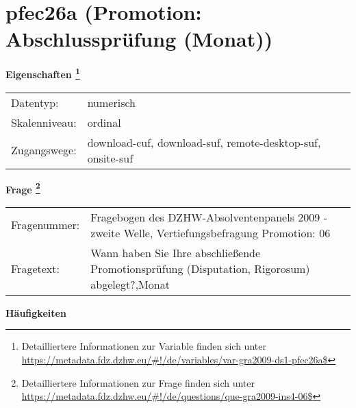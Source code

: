
    \setcounter{footnote}{0}

    \vspace*{-1.8cm}
	\section{pfec26a (Promotion: Abschlussprüfung (Monat))}
	\label{section:pfec26a}



    \vspace*{0.5cm}
    \noindent\textbf{Eigenschaften
	\footnote{Detailliertere Informationen zur Variable finden sich unter
		\url{https://metadata.fdz.dzhw.eu/\#!/de/variables/var-gra2009-ds1-pfec26a$}}}\\
	\begin{tabularx}{\hsize}{@{}lX}
	Datentyp: & numerisch \\
	Skalenniveau: & ordinal \\
	Zugangswege: &
	  download-cuf, 
	  download-suf, 
	  remote-desktop-suf, 
	  onsite-suf
 \\
    \end{tabularx}



				\vspace*{0.5cm}
                \noindent\textbf{Frage
	                \footnote{Detailliertere Informationen zur Frage finden sich unter
		              \url{https://metadata.fdz.dzhw.eu/\#!/de/questions/que-gra2009-ins4-06$}}}\\
				\begin{tabularx}{\hsize}{@{}lX}
					Fragenummer: &
					  Fragebogen des DZHW-Absolventenpanels 2009 - zweite Welle, Vertiefungsbefragung Promotion:
					  06
 \\
					Fragetext: & Wann haben Sie Ihre abschließende Promotionsprüfung (Disputation, Rigorosum) abgelegt?,Monat \\
				\end{tabularx}





        		\vspace*{0.5cm}
                \noindent\textbf{Häufigkeiten}

